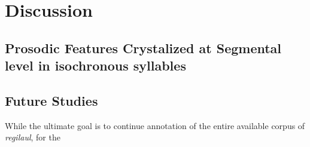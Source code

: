\chapter{Discussion}
%

\section{Prosodic Features Crystalized at Segmental level in isochronous syllables}

\section{Future Studies} 


%
%
%
%
%

While the ultimate goal is to continue annotation of the entire available corpus of {\it regilaul}, for the



